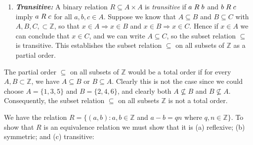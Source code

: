 \documentclass[a4paper,12pt]{article}
\begin{document}
\begin{enumerate}
\item \textit{\textbf{Transitive:}} A binary relation $R \subseteq A \times A$ is \textit{transitive} if $a \hspace{1mm} R \hspace{1mm} b$ and $b \hspace{1mm} R \hspace{1mm} c$ imply $a \hspace{1mm} R \hspace{1mm} c$ for all $a, b, c \in A$. Suppose we know that $A \subseteq B$ and $B \subseteq C$ with $A, B, C, \subset \mathbb{Z}$, so that $x \in A \Rightarrow x \in B$ and $x \in B \Rightarrow x \in C$. Hence if $x \in A$ we can conclude that $x \in C$, and we can write $A \subseteq C$, so the subset relation $\subseteq$ is transitive. This establishes the subset relation $\subseteq$ on all subsets of $\mathbb{Z}$ as a partial order. 
\end{enumerate}

The partial order $\subseteq$ on all subsets of $\mathbb{Z}$ would be a total order if for every $A, B \subset \mathbb{Z}$, we have $A \subseteq B$ or $B \subseteq A$. Clearly this is not the case since we could choose $A = \{1,3,5\}$ and $B = \{2,4,6\}$, and clearly both $A \not\subseteq B$ and $B \not\subseteq A$. Consequently, the subset relation $\subseteq$ on all subsets $\mathbb{Z}$ is not a total order. 

\vspace{5mm}

We have the relation $R = \{(a,b) : a, b \in \mathbb{Z}$ and $a - b = qn$ where $q, n \in \mathbb{Z}\}$. To show that $R$ is an equivalence relation we must show that it is (a) reflexive; (b) symmetric; and (c) transitive:
\end{document}
